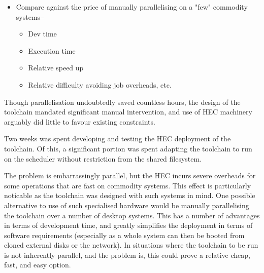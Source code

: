 \begin{itemize}
    \item Compare against the price of manually parallelising on a "few" commodity systems--
        \begin{itemize}
            \item Dev time
            \item Execution time
            \item Relative speed up
            \item Relative difficulty avoiding job overheads, etc.
        \end{itemize}
\end{itemize}

Though parallelisation undoubtedly saved countless hours, the design of the toolchain mandated significant manual intervention, and use of HEC machinery arguably did little to favour existing constraints.

Two weeks was spent developing and testing the HEC deployment of the toolchain.  Of this, a significant portion was spent adapting the toolchain to run on the scheduler without restriction from the shared filesystem.

The problem is embarrassingly parallel, but the HEC incurs severe overheads for some operations that are fast on commodity systems.  This effect is particularly noticable as the toolchain was designed with such systems in mind.  One possible alternative to use of such specialised hardware would be manually parallelising the toolchain over a number of desktop systems.  This has a number of advantages in terms of development time, and greatly simplifies the deployment in terms of software requirements (especially as a whole system can then be booted from cloned external disks or the network).  In situations where the toolchain to be run is not inherently parallel, and the problem is, this could prove a relative cheap, fast, and easy option.


